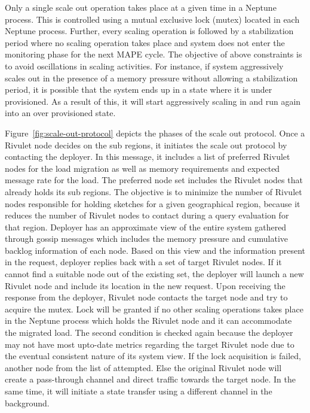 Only a single scale out operation takes place at a given time in a Neptune process.
This is controlled using a mutual exclusive lock (mutex) located in each Neptune process.
Further, every scaling operation is followed by a stabilization period where no scaling operation takes place and system does not enter the monitoring phase for the next MAPE cycle.
The objective of above constraints is to avoid oscillations in scaling activities.
For instance, if system aggressively scales out in the presence of a memory pressure without allowing a stabilization period, it is possible that the system ends up in a state where it is under provisioned. As a result of this, it will start aggressively scaling in and run again into an over provisioned state.

Figure~\ref{fig:scale-out-protocol} depicts the phases of the scale out protocol.
Once a Rivulet node decides on the sub regions, it initiates the scale out protocol by contacting the deployer.
In this message, it includes a list of preferred Rivulet nodes for the load migration as well as memory requirements and expected message rate for the load.
The preferred node set includes the Rivulet nodes that already holds its sub regions.
The objective is to minimize the number of Rivulet nodes responsible for holding sketches for a given geographical region, because it reduces the number of Rivulet nodes to contact during a query evaluation for that region.
Deployer has an approximate view of the entire system gathered through gossip messages which includes the memory pressure and cumulative backlog information of each node.
Based on this view and the information present in the request, deployer replies back with a set of target Rivulet nodes.
If it cannot find a suitable node out of the existing set, the deployer will launch a new Rivulet node and include its location in the new request.
Upon receiving the response from the deployer, Rivulet node contacts the target node and try to acquire the mutex.
Lock will be granted if no other scaling operations takes place in the Neptune process which holds the Rivulet node and it can accommodate the migrated load.
The second condition is checked again because the deployer may not have most upto-date metrics regarding the target Rivulet node due to the eventual consistent nature of its system view.
If the lock acquisition is failed, another node from the list of attempted.
Else the original Rivulet node will create a pass-through channel and direct traffic towards the target node.
In the same time, it will initiate a state transfer using a different channel in the background.
